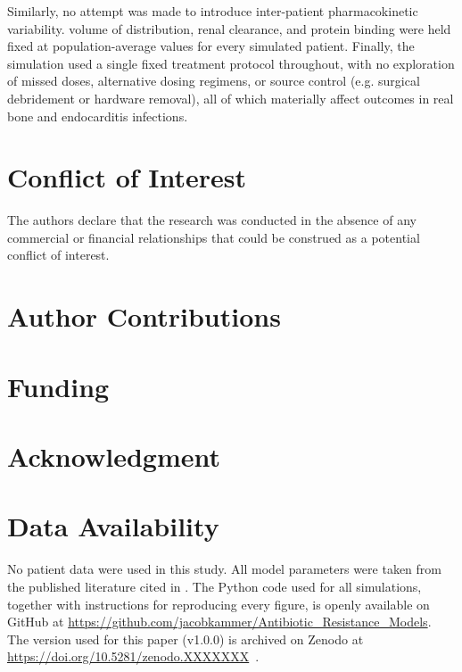 \documentclass[journal]{IEEEtran}
\begin{document}
Similarly, no attempt was made to introduce
inter-patient pharmacokinetic variability.  volume of distribution,
renal clearance, and protein binding were held fixed at population-average
values for every simulated patient. Finally, the simulation
used a single fixed treatment protocol throughout, with no exploration
of missed doses, alternative dosing regimens, or source control (e.g.
surgical debridement or hardware removal), all of which materially
affect outcomes in real bone and endocarditis infections.

\FloatBarrier

\section*{Conflict of Interest}
The authors declare that the research was conducted in the absence of any commercial or financial relationships that could be construed as a potential conflict of interest.

\section*{Author Contributions}

\section*{Funding}

\section*{Acknowledgment}

\section*{Data Availability}
No patient data were used in this study. All model parameters were taken
from the published literature cited in .
The Python code used for all simulations, together with instructions for
reproducing every figure, is openly available on GitHub at
\url{https://github.com/jacobkammer/Antibiotic_Resistance_Models}.
The version used for this paper (v1.0.0) is archived on Zenodo at
\url{https://doi.org/10.5281/zenodo.XXXXXXX}~\cite{Kammer2026code}.

\raggedbottom


\end{document}
